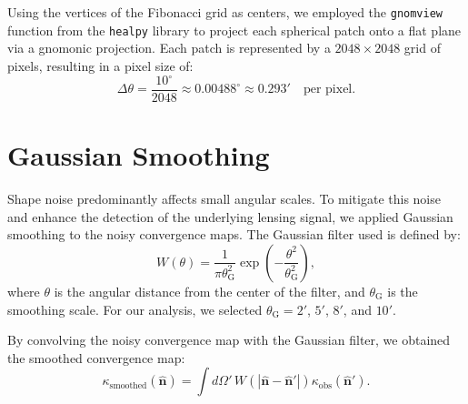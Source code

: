 Using the vertices of the Fibonacci grid as centers, we employed the \texttt{gnomview} function from the \texttt{healpy} library \citep{Zonca2019} to project each spherical patch onto a flat plane via a gnomonic projection. Each patch is represented by a $2048 \times 2048$ grid of pixels, resulting in a pixel size of:
\begin{equation}
    \Delta \theta = \frac{10^\circ}{2048} \approx 0.00488^\circ \approx 0.293' \quad \text{per pixel}.
\end{equation}

\section{Gaussian Smoothing}
Shape noise predominantly affects small angular scales. To mitigate this noise and enhance the detection of the underlying lensing signal, we applied Gaussian smoothing to the noisy convergence maps. The Gaussian filter used is defined by:
\begin{equation}
    W(\theta) = \frac{1}{\pi \theta_{\mathrm{G}}^2} \exp\left( -\frac{\theta^2}{\theta_{\mathrm{G}}^2} \right),
\end{equation}
where $\theta$ is the angular distance from the center of the filter, and $\theta_{\mathrm{G}}$ is the smoothing scale. For our analysis, we selected $\theta_{\mathrm{G}} = 2'$, $5'$, $8'$, and $10'$.

By convolving the noisy convergence map with the Gaussian filter, we obtained the smoothed convergence map:
\begin{equation}
    \kappa_{\mathrm{smoothed}}(\hat{\mathbf{n}}) = \int d\Omega' \, W(|\hat{\mathbf{n}} - \hat{\mathbf{n}}'|) \kappa_{\mathrm{obs}}(\hat{\mathbf{n}}').
\end{equation}


